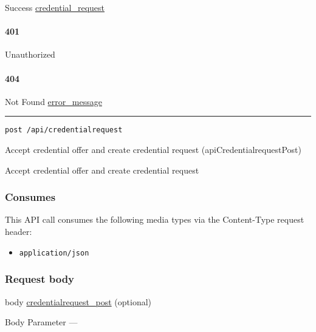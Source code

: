 Success \protect\hyperlink{credential_request}{credential\_request}

\hypertarget{section-233}{%
\paragraph{401}\label{section-233}}

Unauthorized \protect\hyperlink{}{}

\hypertarget{section-234}{%
\paragraph{404}\label{section-234}}

Not Found \protect\hyperlink{error_message}{error\_message}

\begin{center}\rule{0.5\linewidth}{\linethickness}\end{center}

\protect\hypertarget{apiCredentialrequestPost}{}{}

\begin{verbatim}
post /api/credentialrequest
\end{verbatim}

Accept credential offer and create credential request
({apiCredentialrequestPost})

Accept credential offer and create credential request

\hypertarget{consumes-22}{%
\subsubsection{Consumes}\label{consumes-22}}

This API call consumes the following media types via the {Content-Type}
request header:

\begin{itemize}
\tightlist
\item
  \texttt{application/json}
\end{itemize}

\hypertarget{request-body-22}{%
\subsubsection{Request body}\label{request-body-22}}

body \protect\hyperlink{credentialrequest_post}{credentialrequest\_post}
(optional)

{Body Parameter} ---


